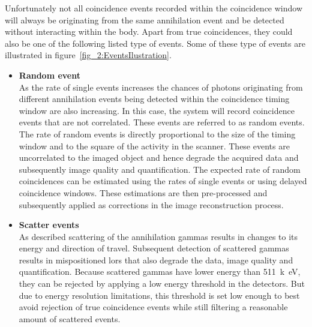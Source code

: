 %
Unfortunately not all coincidence events recorded within the coincidence window will always be originating from the same annihilation event and be detected without interacting within the body. Apart from true coincidences, they could also be one of the following listed type of events. Some of these type of events are illustrated in figure~\ref{fig_2:EventsIlustration}.
%
\begin{itemize}
\item\textbf{Random event}\\
As the rate of single events increases the chances of photons originating from different annihilation events being detected within the coincidence timing window are also increasing.
In this case, the system will record coincidence events that are not correlated. These events are referred to as random events. 
The rate of random events is directly proportional to the size of the timing window and to the square of the activity in the scanner. These events are uncorrelated to the imaged object and hence degrade the acquired data and subsequently image quality and quantification.  
The expected rate of random coincidences can be estimated using the rates of single events or using delayed coincidence windows. These estimations are then pre-processed and subsequently applied as corrections in the image reconstruction process. 
%
%
\item\textbf{Scatter events}\\
As described scattering of the annihilation gammas results in changes to its energy and direction of travel. Subsequent detection of scattered gammas results in mispositioned \glspl{lor} that also degrade the data, image quality and quantification. 
Because scattered gammas have lower energy than 511~\si{k\electronvolt}, they can be rejected by applying a low energy threshold in the detectors. But due to energy resolution limitations, this threshold is set low enough to best avoid rejection of true coincidence events while still filtering a reasonable amount of scattered events.

\end{itemize}
